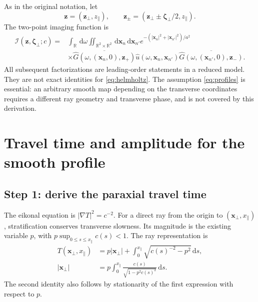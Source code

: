\documentclass[11pt]{article}
\newcommand{\R}{\mathbb{R}}
\newcommand{\bx}{\bm{x}}
\newcommand{\bz}{\bm{z}}
\newcommand{\bzeta}{\boldsymbol{\zeta}}
\newcommand{\dd}{\,\mathrm{d}}
\begin{document}
As in the original notation, let
\begin{equation}
\bz=(\bz_\perp,z_\parallel),\qquad
\bz_\pm=(\bz_\perp\pm\bzeta_\perp/2,z_\parallel).
\label{eq:zpm}
\end{equation}
The two-point imaging function is
\begin{align}
\mathcal I(\bz,\bzeta_\perp;c)
={}&\int_\R\dd\omega
\iint_{\R^2\times\R^2}\dd\bx_n\dd\bx_{n'}
e^{-(|\bx_n|^2+|\bx_{n'}|^2)/a^2}
\nonumber\\
&\times
\overline{\widehat G(\omega,(\bx_n,0),\bz_+)}
\widehat u(\omega,\bx_n,\bx_{n'})
\overline{\widehat G(\omega,(\bx_{n'},0),\bz_-)}.
\label{eq:image}
\end{align}
All subsequent factorizations are leading-order statements in a reduced
model. They are not exact identities for \eqref{eq:helmholtz}.
The assumption \eqref{eq:profiles} is essential: an arbitrary smooth
map depending on the transverse coordinates requires a different ray
geometry and transverse phase, and is not covered by this derivation.

\section{Travel time and amplitude for the smooth profile}

\subsection{Step 1: derive the paraxial travel time}

The eikonal equation is $|\nabla T|^2=c^{-2}$. For a direct ray from the
origin to $(\bx_\perp,x_\parallel)$, stratification conserves transverse
slowness. Its magnitude is the existing variable $p$, with
$p\sup_{0\leq s\leq x_\parallel}c(s)<1$. The ray representation is
\begin{align}
T(\bx_\perp,x_\parallel)
&=p|\bx_\perp|
+\int_0^{x_\parallel}\sqrt{c(s)^{-2}-p^2}\dd s,
\label{eq:ray-time}\\
|\bx_\perp|
&=p\int_0^{x_\parallel}
\frac{c(s)}{\sqrt{1-p^2c(s)^2}}\dd s.
\label{eq:ray-arrival}
\end{align}
The second identity also follows by stationarity of the first expression
with respect to $p$.
\end{document}
